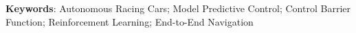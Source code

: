 \begin{enumerate}
\end{enumerate}

\noindent \textbf{Keywords}: Autonomous Racing Cars; Model Predictive Control; Control Barrier Function; Reinforcement Learning; End-to-End Navigation